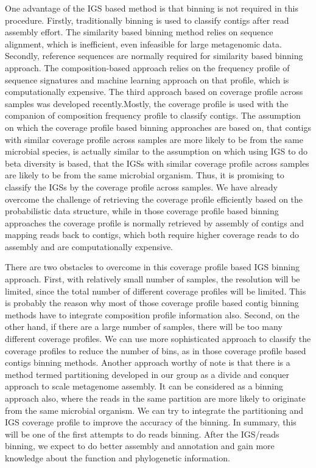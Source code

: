 One advantage of the IGS based method is that binning is not required in this
procedure. Firstly, traditionally binning is used to classify contigs after read
assembly effort. The similarity based binning method relies on
sequence alignment, which is inefficient, even infeasible for large
metagenomic data. Secondly, reference sequences are normally required for
similarity based binning approach. The composition-based approach relies on the
frequency profile of sequence signatures and machine learning approach on that
profile, which is computationally expensive. 
The third approach based on coverage profile across samples was developed
recently\cite{Albertsen2013,Karlsson2013,Alneberg2014,Nielsen2014,Imelfort2014}.Mostly, the coverage
profile is used with the companion of composition frequency profile to classify
contigs. The assumption on which the coverage profile based binning approaches
are based on, that contigs with similar coverage profile across samples are
more likely to be from the same microbial species, is actually similar to the
assumption on which using IGS to do beta diversity is based, that the IGSs with
similar coverage profile across samples are likely to be from the same
microbial organism. Thus, it is promising to classify the IGSs by the coverage
profile across samples. We have already overcome the challenge of retrieving the
coverage profile efficiently based on the probabilistic data structure, while
in those coverage profile based binning approaches the coverage profile is 
normally retrieved by assembly of contigs and mapping
reads back to contigs, which both require higher coverage reads to do assembly
and are computationally expensive. 

There are two obstacles to overcome in this coverage profile based
IGS binning approach. First, with relatively small number of samples, the
resolution will be limited, since the total number of different coverage
profiles will be limited. This is probably the reason why most of those coverage
profile based contig binning methods have to integrate composition profile information
also. Second, on the other hand, if there are a large number of samples, there
will be too many different coverage profiles. We can use more sophisticated
 approach to classify the coverage profiles to reduce the number of bins,
as in those coverage profile based contigs binning methods. Another approach
worthy of note is that there is a method termed partitioning developed in
our group as a divide and conquer approach to scale metagenome assembly. It can be 
considered as a binning approach also, where the reads in the same
partition are more likely to originate from the same microbial organism. We can
try to integrate the partitioning and IGS coverage profile to improve the
accuracy of the binning. In summary, this will be one of the first attempts to
do reads binning. After the IGS/reads binning,  we expect to do better assembly
 and annotation and gain more knowledge about the
function and phylogenetic information.  

